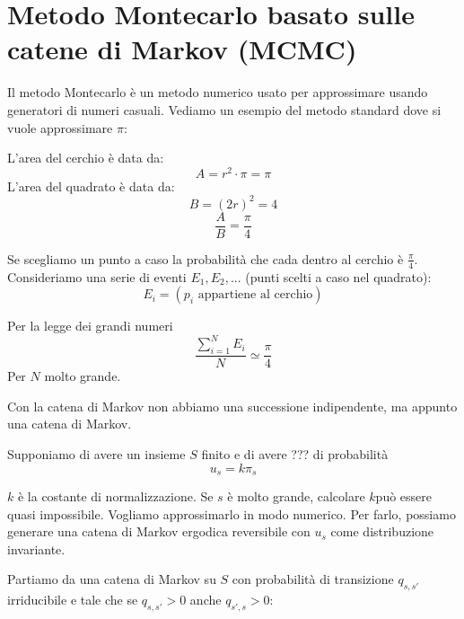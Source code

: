 \documentclass[a4paper,12pt]{book}
\newcommand\ddfrac[2]{\frac{\displaystyle #1}{\displaystyle #2}}
\begin{document}
\section{Metodo Montecarlo basato sulle catene di Markov (MCMC)}
Il metodo Montecarlo è un metodo numerico usato per approssimare usando generatori di numeri casuali. Vediamo un esempio del metodo standard dove si vuole approssimare $\pi$:
\begin{multicols}{2}
	
	L'area del cerchio è data da:
	$$ A = r^2\cdot \pi = \pi $$
	L'area del quadrato è data da:
	$$ B = (2r)^2 = 4 $$
	$$ \ddfrac{A}{B} = \frac{\pi}{4}$$
	
\end{multicols}

Se scegliamo un punto a caso la probabilità che cada dentro al cerchio è $\frac{\pi}{4}$. Consideriamo una serie di eventi $ E_1, E_2, ... $ (punti scelti a caso nel quadrato):
$$ E_i = (p_i \text{ appartiene al cerchio})$$

Per la legge dei grandi numeri
$$ \ddfrac{\sum_{i=1}^{N} E_i}{N} \simeq \ddfrac{\pi}{4} $$
Per $ N $ molto grande. 

Con la catena di Markov non abbiamo una successione indipendente, ma appunto una catena di Markov. %

Supponiamo di avere un insieme $ S $ finito e di avere ??? %
di probabilità 
$$ u_s = k\pi_s $$

$ k $ è la costante di normalizzazione. Se $ s $ è molto grande, calcolare $ k $può essere quasi impossibile. Vogliamo approssimarlo in modo numerico. Per farlo, possiamo generare una catena di Markov ergodica reversibile con $ u_s $ come distribuzione invariante. 

Partiamo da una catena di Markov su $ S $ con probabilità di transizione $ q_{s,s'} $ irriducibile e tale che se $ q_{s,s'} > 0 $ anche $ q_{s',s} > 0 $:
\end{document}
